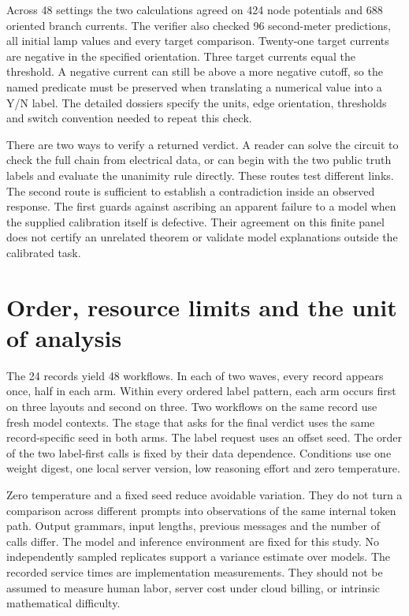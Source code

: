 \documentclass[12pt,letterpaper]{article}
\begin{document}
Across 48 settings the two calculations agreed on 424 node potentials and 688 oriented branch currents. The verifier also checked 96 second-meter predictions, all initial lamp values and every target comparison. Twenty-one target currents are negative in the specified orientation. Three target currents equal the threshold. A negative current can still be above a more negative cutoff, so the named predicate must be preserved when translating a numerical value into a Y/N label. The detailed dossiers specify the units, edge orientation, thresholds and switch convention needed to repeat this check.

There are two ways to verify a returned verdict. A reader can solve the circuit to check the full chain from electrical data, or can begin with the two public truth labels and evaluate the unanimity rule directly. These routes test different links. The second route is sufficient to establish a contradiction inside an observed response. The first guards against ascribing an apparent failure to a model when the supplied calibration itself is defective. Their agreement on this finite panel does not certify an unrelated theorem or validate model explanations outside the calibrated task.

\section{Order, resource limits and the unit of analysis}
The 24 records yield 48 workflows. In each of two waves, every record appears once, half in each arm. Within every ordered label pattern, each arm occurs first on three layouts and second on three. Two workflows on the same record use fresh model contexts. The stage that asks for the final verdict uses the same record-specific seed in both arms. The label request uses an offset seed. The order of the two label-first calls is fixed by their data dependence. Conditions use one weight digest, one local server version, low reasoning effort and zero temperature.

Zero temperature and a fixed seed reduce avoidable variation. They do not turn a comparison across different prompts into observations of the same internal token path. Output grammars, input lengths, previous messages and the number of calls differ. The model and inference environment are fixed for this study. No independently sampled replicates support a variance estimate over models. The recorded service times are implementation measurements. They should not be assumed to measure human labor, server cost under cloud billing, or intrinsic mathematical difficulty.
\end{document}
